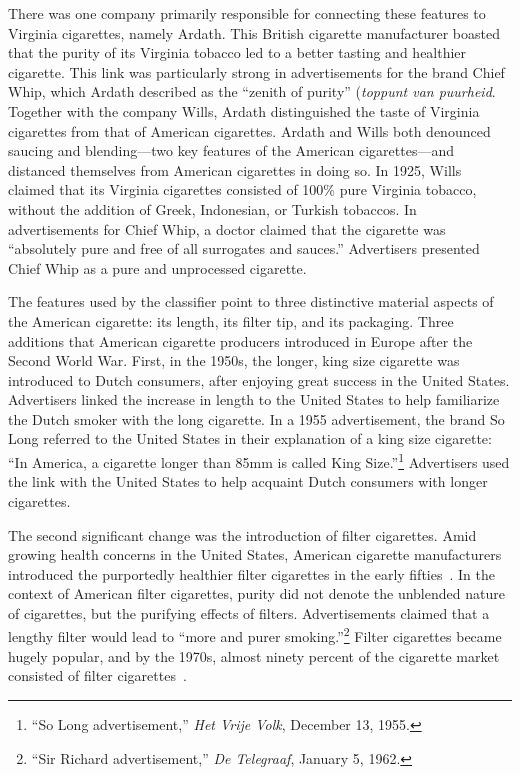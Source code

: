 \documentclass[USenglish]{article}
\begin{document}
There was one company primarily responsible for connecting these features to Virginia cigarettes, namely Ardath. This British cigarette manufacturer boasted that the purity of its Virginia tobacco led to a better tasting and healthier cigarette. This link was particularly strong in advertisements for the brand Chief Whip, which Ardath described as the ``zenith of purity'' (\textit{toppunt van puurheid}. Together with the company Wills, Ardath distinguished the taste of Virginia cigarettes from that of American cigarettes. Ardath and Wills both denounced saucing and blending---two key features of the American cigarettes---and distanced themselves from American cigarettes in doing so. In 1925, Wills claimed that its Virginia cigarettes consisted of 100\% pure Virginia tobacco, without the addition of Greek, Indonesian, or Turkish tobaccos. In advertisements for Chief Whip, a doctor claimed that the cigarette was ``absolutely pure and free of all surrogates and sauces.'' Advertisers presented Chief Whip as a pure and unprocessed cigarette.

The features used by the classifier point to three distinctive material aspects of the American cigarette: its length, its filter tip, and its packaging. Three additions that American cigarette producers introduced in Europe after the Second World War. 
%
First, in the 1950s, the longer, king size cigarette was introduced to Dutch consumers, after enjoying great success in the United States. Advertisers linked the increase in length to the United States to help familiarize the Dutch smoker with the long cigarette. In a 1955 advertisement, the brand So Long referred to the United States in their explanation of a king size cigarette: ``In America, a cigarette longer than 85mm is called King Size.''\footnote{``So Long advertisement,'' \textit{Het Vrije Volk}, December 13, 1955.} Advertisers used the link with the United States to help acquaint Dutch consumers with longer cigarettes.

The second significant change was the introduction of filter cigarettes. Amid growing health concerns in the United States, American cigarette manufacturers introduced the purportedly healthier filter cigarettes in the early fifties~\cite[244]{brandt_cigarette_2009}. In the context of American filter cigarettes, purity did not denote the unblended nature of cigarettes, but the purifying effects of filters. Advertisements claimed that a lengthy filter would lead to ``more and purer smoking.''\footnote{``Sir Richard advertisement,'' \textit{De Telegraaf}, January 5, 1962.} Filter cigarettes became hugely popular, and by the 1970s, almost ninety percent of the cigarette market consisted of filter cigarettes~\cite[244]{brandt_cigarette_2009}. 
\end{document}
